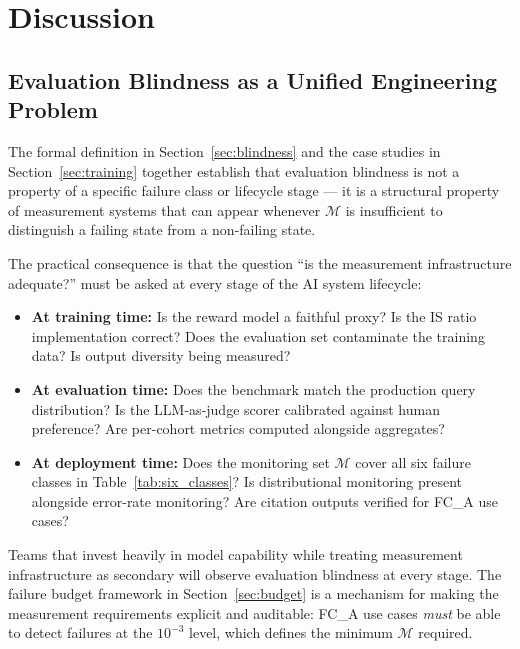 \documentclass{article}
\begin{document}
\section{Discussion}
\label{sec:discussion}

\subsection{Evaluation Blindness as a Unified Engineering Problem}

The formal definition in Section~\ref{sec:blindness} and the case studies
in Section~\ref{sec:training} together establish that evaluation blindness
is not a property of a specific failure class or lifecycle stage --- it is
a structural property of measurement systems that can appear whenever
$\mathcal{M}$ is insufficient to distinguish a failing state from a
non-failing state.

The practical consequence is that the question ``is the measurement infrastructure
adequate?'' must be asked at every stage of the AI system lifecycle:

\begin{itemize}
  \item \textbf{At training time:} Is the reward model a faithful proxy? Is the
        IS ratio implementation correct? Does the evaluation set contaminate
        the training data? Is output diversity being measured?

  \item \textbf{At evaluation time:} Does the benchmark match the production
        query distribution? Is the LLM-as-judge scorer calibrated against
        human preference? Are per-cohort metrics computed alongside aggregates?

  \item \textbf{At deployment time:} Does the monitoring set $\mathcal{M}$
        cover all six failure classes in Table~\ref{tab:six_classes}? Is
        distributional monitoring present alongside error-rate monitoring?
        Are citation outputs verified for FC\_A use cases?
\end{itemize}

Teams that invest heavily in model capability while treating measurement
infrastructure as secondary will observe evaluation blindness at every stage.
The failure budget framework in Section~\ref{sec:budget} is a mechanism for
making the measurement requirements explicit and auditable: FC\_A use cases
\emph{must} be able to detect failures at the $10^{-3}$ level, which defines
the minimum $\mathcal{M}$ required.
\end{document}
